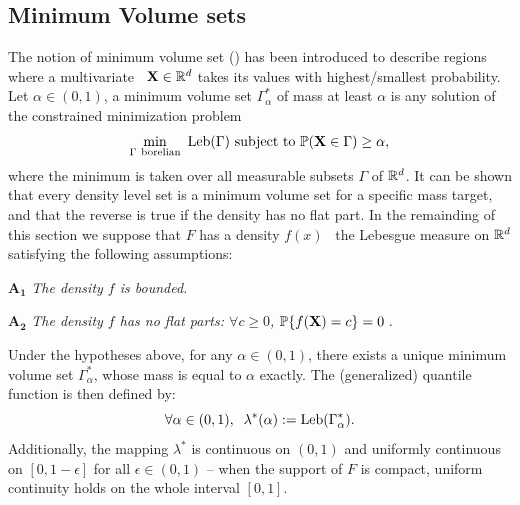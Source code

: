 \subsection{Minimum Volume sets}
\label{resume:mv-set}
The notion of minimum volume set (\cite{Polonik97, Einmahl1992}) has been introduced to describe regions where a multivariate \rv~$\mathbf X \in \mathbb{R}^d$ takes its values with highest/smallest probability.  Let $\alpha\in (0,1)$, a minimum volume set $\Gamma^*_{\alpha}$ of mass at least $\alpha$ is any solution of the constrained minimization problem
\begin{equation}\label{eq:MV}\min_{\Gamma~ \text{borelian}} ~\text{Leb}(\Gamma) \mbox{~subject to~} \mathbb{P}(\mathbf X \in \Gamma) \ge \alpha,
\end{equation}
where the minimum is taken over all measurable subsets $\Gamma$ of $\mathbb{R}^d$.
It can be shown that every density level set is a minimum volume set for a specific mass target, and that the reverse is true if the density has no flat part. %
%
In the remainding of this section we suppose that $F$ has a density $f(x)$ \wrt~the Lebesgue measure on $\mathbb{R}^d$ satisfying the following assumptions:

\noindent $\mathbf{A_1}$ {\it The density $f$ is bounded.}%

\noindent $\mathbf{A_2}$ {\it The density $f$ has no flat parts: $\forall c\geq 0$, $\mathbb{P}\{f(\mathbf X)=c\}=0~.$}

Under the hypotheses above, for any $\alpha\in (0,1)$, there exists a unique minimum volume set $\Gamma_\alpha^*$, whose mass is equal to $\alpha$ exactly.
The (generalized) quantile function is then defined by:
$$
\forall \alpha\in (0,1),\;\; \lambda^*(\alpha) := \text{Leb}(\Gamma^*_{\alpha}).
$$
Additionally, the mapping $\lambda^*$ is continuous on $(0,1)$ and uniformly continuous on $[0,1-\epsilon]$ for all $\epsilon \in (0,1)$ -- when the support of $F$ is compact, uniform continuity holds on the whole interval $[0,1]$.


